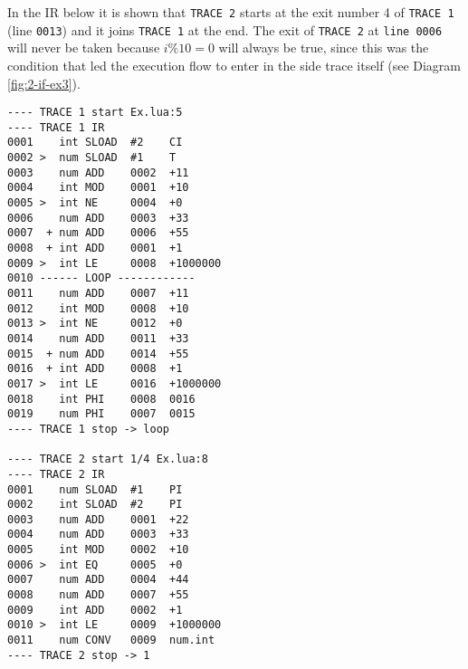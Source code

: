 \noindent
In the IR below it is shown that \texttt{TRACE 2} starts at the exit number 4 of \texttt{TRACE 1} (line \texttt{0013}) and it joins \texttt{TRACE 1} at the end. The exit of \texttt{TRACE 2} at \texttt{line 0006} will never be taken because $i\%10 = 0$ will always be true, since this was the condition that led the execution flow to enter in the side trace itself (see Diagram \ref{fig:2-if-ex3}).

\begin{multicols}{2}
\begin{lstlisting}[style=DumpStyle]
---- TRACE 1 start Ex.lua:5
---- TRACE 1 IR
0001    int SLOAD  #2    CI
0002 >  num SLOAD  #1    T
0003    num ADD    0002  +11 
0004    int MOD    0001  +10 
0005 >  int NE     0004  +0  
0006    num ADD    0003  +33 
0007  + num ADD    0006  +55 
0008  + int ADD    0001  +1  
0009 >  int LE     0008  +1000000
0010 ------ LOOP ------------
0011    num ADD    0007  +11 
0012    int MOD    0008  +10 
0013 >  int NE     0012  +0  
0014    num ADD    0011  +33 
0015  + num ADD    0014  +55 
0016  + int ADD    0008  +1  
0017 >  int LE     0016  +1000000
0018    int PHI    0008  0016
0019    num PHI    0007  0015
---- TRACE 1 stop -> loop

---- TRACE 2 start 1/4 Ex.lua:8
---- TRACE 2 IR
0001    num SLOAD  #1    PI
0002    int SLOAD  #2    PI
0003    num ADD    0001  +22 
0004    num ADD    0003  +33 
0005    int MOD    0002  +10 
0006 >  int EQ     0005  +0  
0007    num ADD    0004  +44 
0008    num ADD    0007  +55 
0009    int ADD    0002  +1  
0010 >  int LE     0009  +1000000
0011    num CONV   0009  num.int
---- TRACE 2 stop -> 1
\end{lstlisting}
\end{multicols}


